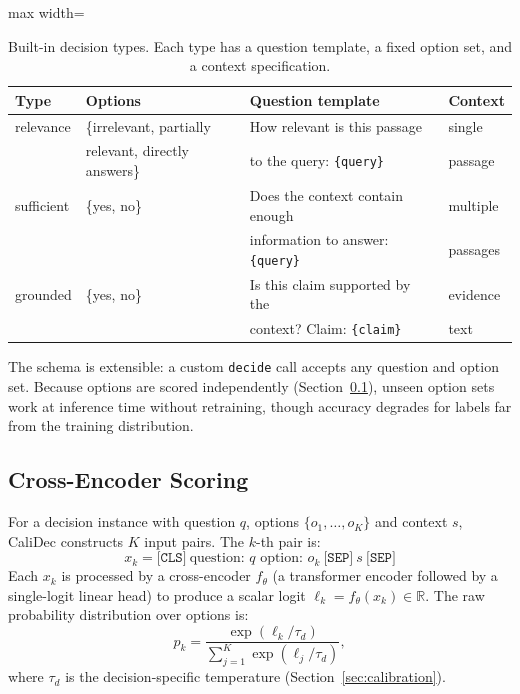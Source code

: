 \documentclass[twocolumn]{ICCKjournal}
\newcommand{\logit}{\ell}
\begin{document}
\begin{table}[H]
\caption{Built-in decision types. Each type has a question template, a fixed option set, and a context specification.}
\label{tab:decisions}
\centering
\small
\begin{adjustbox}{max width=\linewidth}
\begin{tabular}{llll}
\toprule
\textbf{Type} & \textbf{Options} & \textbf{Question template} & \textbf{Context} \\
\midrule
relevance & \{irrelevant, partially & How relevant is this passage & single \\
 & relevant, directly answers\} & to the query: \texttt{\{query\}} & passage \\
\addlinespace
sufficient & \{yes, no\} & Does the context contain enough & multiple \\
 & & information to answer: \texttt{\{query\}} & passages \\
\addlinespace
grounded & \{yes, no\} & Is this claim supported by the & evidence \\
 & & context? Claim: \texttt{\{claim\}} & text \\
\bottomrule
\end{tabular}
\end{adjustbox}
\end{table}

The schema is extensible: a custom \texttt{decide} call accepts any question and option set. Because options are scored independently (Section~\ref{sec:model}), unseen option sets work at inference time without retraining, though accuracy degrades for labels far from the training distribution.

\subsection{Cross-Encoder Scoring}
\label{sec:model}
For a decision instance with question $q$, options $\{o_1, \dots, o_K\}$ and context $s$, CaliDec constructs $K$ input pairs. The $k$-th pair is:
\begin{equation}
    x_k = \texttt{[CLS]}\ \text{question: } q \text{ option: } o_k\ \texttt{[SEP]}\ s\ \texttt{[SEP]}
    \label{eq:input}
\end{equation}
Each $x_k$ is processed by a cross-encoder $f_\theta$ (a transformer encoder followed by a single-logit linear head) to produce a scalar logit $\logit_k = f_\theta(x_k) \in \mathbb{R}$. The raw probability distribution over options is:
\begin{equation}
    p_k = \frac{\exp(\logit_k / \tau_d)}{\sum_{j=1}^{K} \exp(\logit_j / \tau_d)},
    \label{eq:softmax}
\end{equation}
where $\tau_d$ is the decision-specific temperature (Section~\ref{sec:calibration}).
\end{document}
